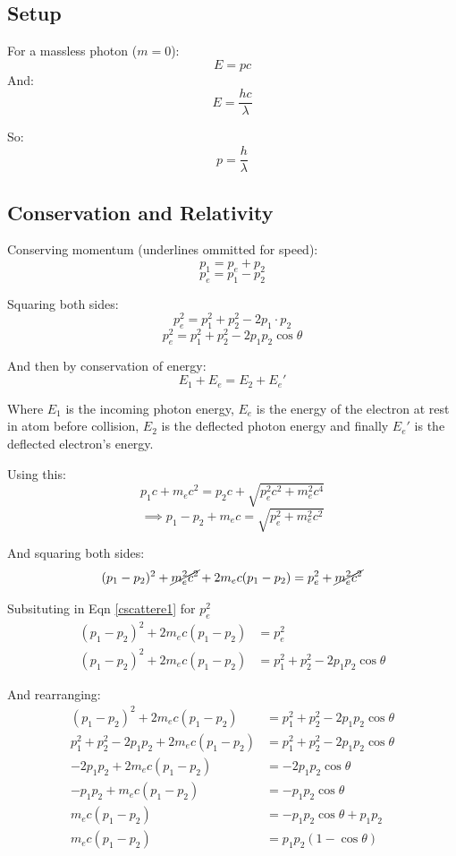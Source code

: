 \subsection*{Setup}
For a massless photon ($m = 0$):
\[
    E = pc
\]
And:
\[
    E = \frac{hc}{\lambda}
\]

So:
\begin{equation}
    p = \frac{h}{\lambda}
    \label{cscattere2}
\end{equation}

\subsection*{Conservation and Relativity}
Conserving momentum (underlines ommitted for speed):
\[
    p_1 = p_e + p_2
\]
\[
    p_e = p_1 - p_2
\]

Squaring both sides:
\[
    p_e^2 = p_1^2 + p_2^2 - 2p_1 \cdot p_2
\]
\begin{equation}
    p_e^2 = p_1^2 + p_2^2 - 2p_1p_2 \cos \theta
    \label{cscattere1}    
\end{equation}

And then by conservation of energy:
\[
    E_1 + E_e = E_2 + E_e'
\]

Where $E_1$ is the incoming photon energy, $E_e$ is the energy of the electron at rest in atom before collision, $E_2$ is the deflected photon energy and finally $E_e'$ is the deflected electron's energy.

Using this:
\[
    p_1c + m_e c^2 = p_2 c + \sqrt{p_e^2c^2 + m_e^2c^4}
\]
\[
    \implies p_1 - p_2 + m_ec = \sqrt{p_e^2 + m_e^2c^2}
\]

And squaring both sides:
\[
    (p_1 - p_2)^2 + \cancel{m_e^2c^2} + 2m_ec(p_1 - p_2) = p_e^2 + \cancel{m_e^2c^2}
\]

Subsituting in Eqn \ref{cscattere1} for $p_e^2$
\begin{align*}
    (p_1 - p_2)^2 + 2m_ec(p_1 - p_2) &= p_e^2\\
    (p_1 - p_2)^2 + 2m_ec(p_1 - p_2) &= p_1^2 + p_2^2 - 2p_1p_2 \cos \theta
\end{align*}

And rearranging:
\begin{align*}
    (p_1 - p_2)^2 + 2m_ec(p_1 - p_2) &= p_1^2 + p_2^2 - 2p_1p_2 \cos \theta\\
    p_1^2 + p_2^2 - 2p_1p_2 + 2m_ec(p_1 - p_2) &= p_1^2 + p_2^2 - 2p_1p_2 \cos \theta\\
    -2p_1p_2 + 2m_ec(p_1 - p_2) &= - 2p_1p_2 \cos \theta\\
    -p_1p_2 + m_ec(p_1 - p_2) &= - p_1p_2 \cos \theta\\
    m_ec(p_1 - p_2) &= - p_1p_2 \cos \theta + p_1p_2\\
    m_ec(p_1 - p_2) &= p_1p_2 (1 - \cos \theta) 
\end{align*}

